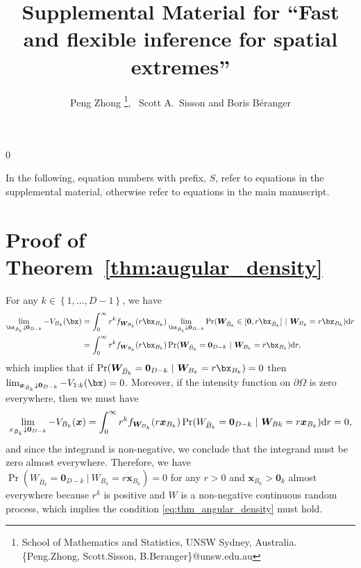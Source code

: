 \documentclass[12pt]{article}
\newcommand{\snum}{S}
\newcommand{\blind}{0}
\begin{document}
\def\spacingset#1{\renewcommand{\baselinestretch}%
{#1}\small\normalsize} \spacingset{1}

\title{\bf Supplemental Material for ``Fast and flexible inference for spatial extremes''}
\blind{
  \author{Peng Zhong
  \footnote{School of Mathematics and Statistics, UNSW Sydney, Australia.\\ \{Peng.Zhong, Scott.Sisson, B.Beranger\}@unsw.edu.au},
  \ Scott A.~Sisson and Boris B\'{e}ranger}
  \maketitle
} \fi

\baselineskip=26pt

\appendix

In the following, equation numbers with prefix, $\snum$, refer to equations in the supplemental material, otherwise refer to equations in the main manuscript.

\section{Proof of Theorem~\ref{thm:augular_density}}

For any $k \in \left\{1, \ldots, D-1 \right\}$, we have
%
\begin{align*}
\lim_{\bx_{\bar{B}_k} \downarrow \bm 0_{D-k} } -V_{B_k}(\bx) 
&= \int_0^\infty r^k f_{\bm W_{B_k}}(r \bx_{B_k}) \lim_{\bx_{\bar{B}_k} \downarrow \bm 0_{D-k} }\Pr(\bm W_{\bar{B}_k} \in [\bm 0,r \bx_{\bar{B}_k} ]\ |\ \bm W_{B_k} = r \bx_{B_k} )\text dr\\
&= \int_0^\infty r^k f_{\bm W_{B_k}}(r \bx_{B_k})\Pr(\bm W_{\bar{B}_k}=\bm 0_{D-k}\ |\ \bm W_{B_k}=r \bx_{B_k} )\text dr,
\end{align*}
%
which implies that if $\Pr(\bm W_{\bar{B}_k}=\bm 0_{D-k}\ |\ \bm W_{B_k}=r \bx_{B_k}) = 0$ then $\lim_{\bm x_{\bar{B}_k} \downarrow \bm 0_{D-k} } -V_{1:k}(\bx) = 0$. Moreover, if the intensity function on $\partial\Omega$ is zero everywhere, then we must have 
$$
\lim_{x_{\bar{B}_k}\downarrow \bm 0_{D-k} } -V_{B_k}(\bm x) 
= \int_0^\infty r^k f_{\bm W_{B_k}}(r \bm x_{B_k})\Pr(W_{\bar{B}_k} = \bm 0_{D-k}\ |\ \bm W_{Bk}=r \bm x_{B_k} )\text dr = 0,
$$
and since the integrand is non-negative, we conclude that the integrand must be zero almost everywhere. Therefore, we have $\Pr(W_{\bar{B}_k} = \bm 0_{D-k}\ |\ W_{B_k}=r\bm x_{B_k} )=0$ for any $r>0$ and $\bm x_{B_k} > \bm 0_k$ almost everywhere because $r^k$ is positive and $W$ is a non-negative continuous random process, which implies the condition \eqref{eq:thm_angular_density} must hold.
\end{document}
